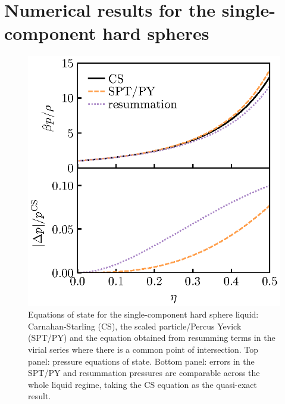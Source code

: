 \documentclass[11pt,twoside]{report}
\begin{document}

\section{Numerical results for the single-component hard spheres}

\begin{figure}
  \includegraphics[width=0.9\linewidth,outer]{resummation-pressure}
  \caption[Accuracy of equation of state from partially resumming the virial series]{
    Equations of state for the single-component hard sphere liquid: Carnahan-Starling (CS), the scaled particle/Percus Yevick (SPT/PY) and the equation obtained from resumming terms in the virial series where there is a common point of intersection.
    Top panel: pressure equations of state.
    Bottom panel: errors in the SPT/PY and resummation pressures are comparable across the whole liquid regime, taking the CS equation as the quasi-exact result.}
  \label{fig:resummation-pressure}
\end{figure}
\end{document}
